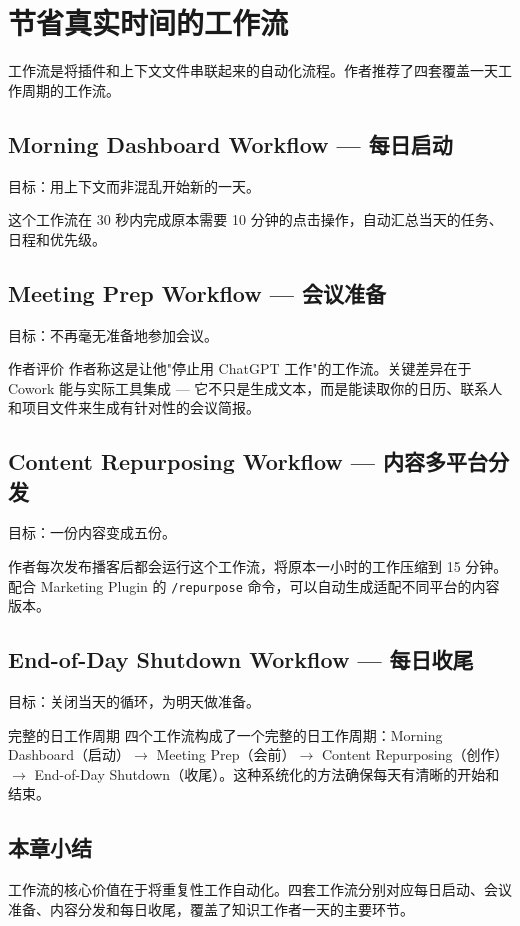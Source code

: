 \section{节省真实时间的工作流}

工作流是将插件和上下文文件串联起来的自动化流程。作者推荐了四套覆盖一天工作周期的工作流。

\subsection{Morning Dashboard Workflow --- 每日启动}

目标：用上下文而非混乱开始新的一天。

这个工作流在 30 秒内完成原本需要 10 分钟的点击操作，自动汇总当天的任务、日程和优先级。

\subsection{Meeting Prep Workflow --- 会议准备}

目标：不再毫无准备地参加会议。

\begin{knowledgebox}{作者评价}
作者称这是让他"停止用 ChatGPT 工作"的工作流。关键差异在于 Cowork 能与实际工具集成 --- 它不只是生成文本，而是能读取你的日历、联系人和项目文件来生成有针对性的会议简报。
\end{knowledgebox}

\subsection{Content Repurposing Workflow --- 内容多平台分发}

目标：一份内容变成五份。

作者每次发布播客后都会运行这个工作流，将原本一小时的工作压缩到 15 分钟。配合 Marketing Plugin 的 \texttt{/repurpose} 命令，可以自动生成适配不同平台的内容版本。

\subsection{End-of-Day Shutdown Workflow --- 每日收尾}

目标：关闭当天的循环，为明天做准备。

\begin{importantbox}{完整的日工作周期}
四个工作流构成了一个完整的日工作周期：Morning Dashboard（启动）$\to$ Meeting Prep（会前）$\to$ Content Repurposing（创作）$\to$ End-of-Day Shutdown（收尾）。这种系统化的方法确保每天有清晰的开始和结束。
\end{importantbox}

\subsection{本章小结}

工作流的核心价值在于将重复性工作自动化。四套工作流分别对应每日启动、会议准备、内容分发和每日收尾，覆盖了知识工作者一天的主要环节。

